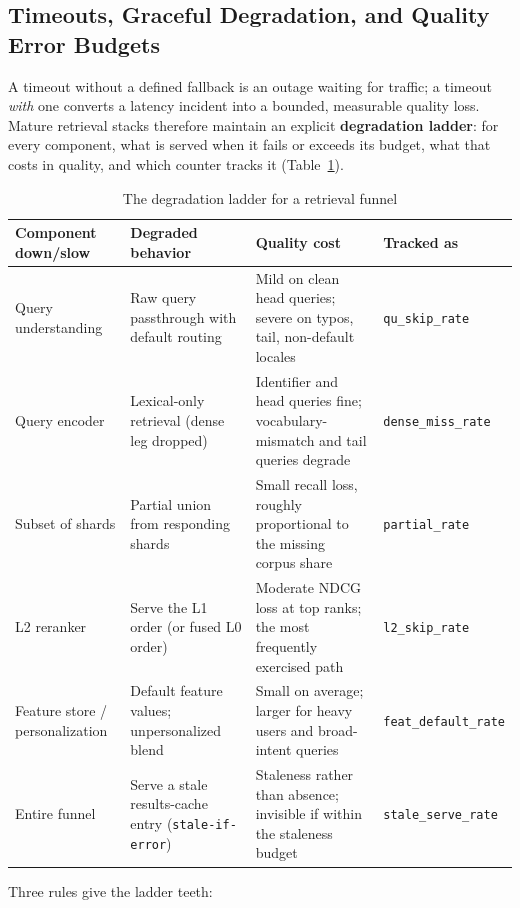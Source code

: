 \subsection{Timeouts, Graceful Degradation, and Quality Error Budgets}

A timeout without a defined fallback is an outage waiting for traffic; a timeout \textit{with} one converts a latency incident into a bounded, measurable quality loss. Mature retrieval stacks therefore maintain an explicit \textbf{degradation ladder}: for every component, what is served when it fails or exceeds its budget, what that costs in quality, and which counter tracks it (Table~\ref{sr:tab:degradation_ladder}).

\begin{table}[H]
\centering
\small
\caption{The degradation ladder for a retrieval funnel}
\label{sr:tab:degradation_ladder}
\begin{tabularx}{\textwidth}{lXXl}
\toprule
\textbf{Component down/slow} & \textbf{Degraded behavior} & \textbf{Quality cost} & \textbf{Tracked as} \\
\midrule
Query understanding & Raw query passthrough with default routing & Mild on clean head queries; severe on typos, tail, non-default locales & \texttt{qu\_skip\_rate} \\
Query encoder & Lexical-only retrieval (dense leg dropped) & Identifier and head queries fine; vocabulary-mismatch and tail queries degrade & \texttt{dense\_miss\_rate} \\
Subset of shards & Partial union from responding shards & Small recall loss, roughly proportional to the missing corpus share & \texttt{partial\_rate} \\
L2 reranker & Serve the L1 order (or fused L0 order) & Moderate NDCG loss at top ranks; the most frequently exercised path & \texttt{l2\_skip\_rate} \\
Feature store / personalization & Default feature values; unpersonalized blend & Small on average; larger for heavy users and broad-intent queries & \texttt{feat\_default\_rate} \\
Entire funnel & Serve a stale results-cache entry (\texttt{stale-if-error}) & Staleness rather than absence; invisible if within the staleness budget & \texttt{stale\_serve\_rate} \\
\bottomrule
\end{tabularx}
\end{table}

Three rules give the ladder teeth:

